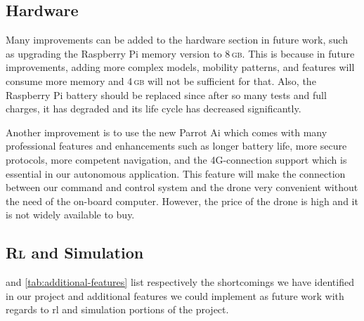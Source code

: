 \documentclass[../main.tex]{subfiles}
\begin{document}
\subsection{Hardware}

Many improvements can be added to the hardware section in future work,
such as upgrading the Raspberry Pi memory version to 8\,\textsc{gb}.
This is because in future improvements, adding more complex models,
mobility patterns, and features will consume more memory and
4\,\textsc{gb} will not be sufficient for that.
Also, the Raspberry Pi battery should be replaced since after so many
tests and full charges, it has degraded and its life cycle has
decreased significantly. 

Another improvement is to use the new Parrot \anafi Ai which comes
with many professional features and enhancements such as longer
battery life, more secure protocols, more competent navigation, and
the 4G-connection support which is essential in our autonomous
application.
This feature will make the connection between our command and control
system and the drone very convenient without the need of the on-board
computer. 
However, the price of the drone is high and it is not widely
available to buy.

\subsection{\textsc{Rl} and Simulation}

 and \cref{tab:additional-features} list
respectively the shortcomings we have identified in our project and
additional features we could implement as future work with regards to
\gls{rl} and simulation portions of the project.
\end{document}

